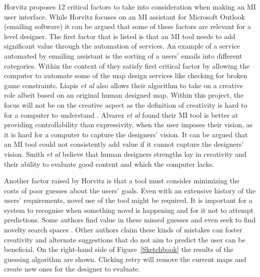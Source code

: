 \documentclass[journal]{IEEEtran}
\begin{document}
Horvitz \cite{horvitz1999principles} proposes 12 critical factors to take into consideration when making an MI user interface. While Horvitz \cite{horvitz1999principles} focuses on an MI assistant for Microsoft Outlook (emailing software) it can be argued that some of these factors are relevant for a level designer. The first factor that is listed is that an MI tool needs to add significant value through the automation of services. An example of a service automated by emailing assistant is the sorting of a users' emails into different categories. Within the context of \cite{liapis2013sentient} they satisfy \cite{horvitz1999principles} first critical factor by allowing the computer to automate some of the map design services like checking for broken game constraints. Liapis \textit{et al} \cite{liapis2013sentient} also allows their algorithm to take on a creative role albeit based on an original human designed map. Within this project, the focus will not be on the creative aspect as the definition of creativity is hard to for a computer to understand \cite{jordanous2010defining}. Alvarez \textit{et al}\cite{alvarez2018fostering} found their MI tool is better at providing controllability than expressivity, when the user imposes their vision, as it is hard for a computer to capture the designers' vision. It can be argued that an MI tool could not consistently add value if it cannot capture the designers' vision. Smith \textit{et al}\cite{smith2011tanagra} believe that human designers strengths lay in creativity and their ability to evaluate good content and which the computer lacks. 

Another factor raised by Horvitz \cite{horvitz1999principles} is that a tool must consider minimizing the costs of poor guesses about the users' goals. Even with an extensive history of the users' requirements, novel use of the tool might be required. It is important for a system to recognise when something novel is happening and for it not to attempt predictions. Some authors find value in these missed guesses and even seek to find novelty search spaces \cite{liapis2013sentient}. Other authors \cite{liapis2016can,alvarez2018fostering, yannakakis2014mixed} claim these kinds of mistakes can foster creativity and alternate suggestions that do not aim to predict the user can be beneficial. On the right-hand side of Figure~\ref{Sketchbook} the results of the guessing algorithm are shown. Clicking retry will remove the current maps and create new ones for the designer to evaluate.
\end{document}
